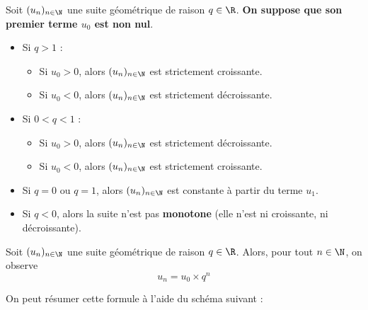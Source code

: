 \documentclass{article}
\begin{document}
\begin{proposition}
Soit $(u_n)_{n \in \N}$ une suite géométrique de raison $q \in \R$. \textbf{On suppose que son premier terme $u_0$ est non nul}.
\begin{itemize}
\item Si $q > 1$ :
\begin{itemize}
\item Si $u_0 > 0$, alors $(u_n)_{n \in \N}$ est strictement croissante.
\item Si $u_0 < 0$, alors $(u_n)_{n \in \N}$ est strictement décroissante.
\end{itemize}
\item Si $0 < q < 1$ : 
\begin{itemize}
\item Si $u_0 > 0$, alors $(u_n)_{n \in \N}$ est strictement décroissante.
\item Si $u_0 < 0$, alors $(u_n)_{n \in \N}$ est strictement croissante. 
\end{itemize}
\item Si $q = 0$ ou $q = 1$, alors $(u_n)_{n \in \N}$ est constante à partir du terme $u_1$.
\item Si $q < 0$, alors la suite n'est pas \textbf{monotone} (elle n'est ni croissante, ni décroissante).
\end{itemize}
\end{proposition}
\begin{proposition}
Soit $(u_n)_{n \in \N}$ une suite géométrique de raison $q \in \R$. Alors, pour tout $n \in \N$, on observe
\begin{equation*}
u_n = u_0 \times q^n
\end{equation*}
\end{proposition}
\begin{remark}
On peut résumer cette formule à l'aide du schéma suivant :
\begin{center}
\end{center}
\end{remark}
\end{document}
